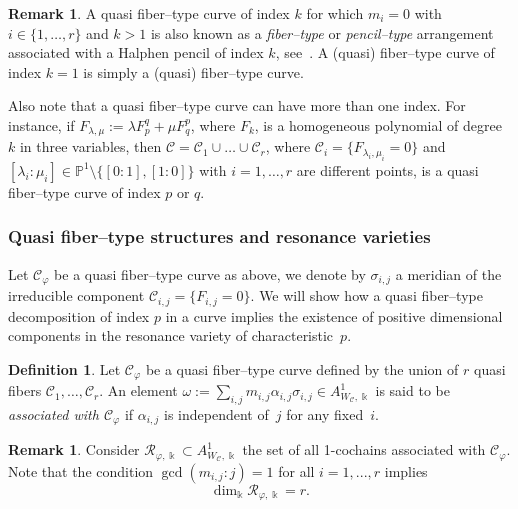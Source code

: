\documentclass[11pt]{amsart}
\def\cC{\mathcal{C}}
\def\cR{{\mathcal R}}
\def\PP{\mathbb{P}}
\def\kk{\Bbbk}
\def\w{\omega}
\theoremstyle{plain}
\theoremstyle{definition}
\newtheorem{definition}[thm]{Definition}
\newtheorem{remark}[thm]{Remark}
\begin{document}
\begin{remark}
\label{rem:halphen_pencil}
A quasi fiber--type curve of index $k$ for which $m_i=0$ with $i \in \{1, \ldots ,r\}$ and $k>1$ is also known as a \emph{fiber--type} or \emph{pencil--type} arrangement associated with a Halphen pencil of index $k$, see~\cite[Section 2]{DLPU}. A (quasi) fiber--type curve of index $k=1$ is simply a (quasi) fiber--type curve.

Also note that a quasi fiber--type curve can have more than one index. For instance, if $F_{\lambda,\mu}:=\lambda F_p^q+\mu F_q^p$, where $F_k$, is a homogeneous polynomial of degree $k$ in three variables, then $\cC=\cC_1\cup \ldots \cup\cC_r$, where $\cC_i=\{F_{\lambda_i,\mu_i}=0\}$ and $[\lambda_i:\mu_i]\in \PP^1\setminus\{[0:1],[1:0]\}$ with $i=1, \ldots ,r$ are different points, is a quasi fiber--type curve of index $p$ or $q$.
\end{remark}

\subsubsection{Quasi fiber--type structures and resonance varieties}

Let $\cC_\varphi$ be a quasi fiber--type curve as above, we denote by $\sigma_{i,j}$ a meridian of the irreducible component $\cC_{i,j}=\{F_{i,j}=0\}$.
We will show how a quasi fiber--type decomposition of index $p$ in a curve implies the existence of positive dimensional components in the resonance variety of characteristic~$p$.

\begin{definition}
\label{def:const_on_fiber}
Let $\cC_\varphi$ be a quasi fiber--type curve defined by the union of $r$ quasi fibers $\cC_1, \dots, \cC_r$. An element 
$\w:= \sum_{i,j} m_{i,j} \alpha_{i,j} \sigma_{i,j}\in A^1_{W_\cC,\kk}$ is said to be 
\emph{associated with $\cC_\varphi$} if $\alpha_{i,j}$ is independent of~$j$ for any fixed~$i$.
\end{definition}

\begin{remark}
Consider $\cR_{\varphi,\kk}\subset A^1_{W_\cC,\kk}$ the set of all 1-cochains associated with $\cC_\varphi$. 
Note that the condition $\gcd(m_{i,j}: j)=1$ for all $i=1,...,r$ implies 
\begin{equation}
\label{eq:R_phi}
\dim_\kk \cR_{\varphi,\kk} = r.
\end{equation}
\end{remark}
\end{document}
